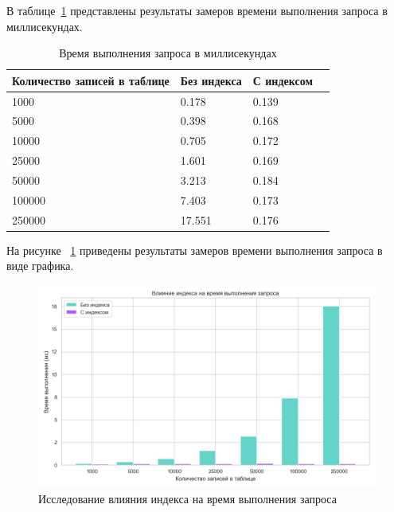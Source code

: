 В таблице~\ref{birthdate_table} представлены результаты замеров времени выполнения запроса в миллисекундах.


\newpage
\begin{table}[ht]
	\begin{center}
		\begin{threeparttable}
			\caption{\label{birthdate_table} Время выполнения запроса в миллисекундах}
			\begin{tabular}{|p{7cm}|p{4cm}|p{4cm}|c|}
				\hline
				\textbf{Количество записей в таблице} & \textbf{Без индекса} & {\textbf{С индексом}} \\ \hline
				1000 & 0.178 & 0.139 \\ \hline
				5000 & 0.398 & 0.168 \\ \hline
				10000 & 0.705 & 0.172 \\ \hline
				25000 & 1.601 & 0.169 \\ \hline
				50000 & 3.213 & 0.184 \\ \hline
				100000 & 7.403 & 0.173 \\ \hline
				250000 & 17.551 & 0.176 \\ \hline
			\end{tabular}
		\end{threeparttable}
	\end{center}
\end{table}

На рисунке ~\ref{birth_graph} приведены результаты замеров времени выполнения запроса в виде графика.

\begin{figure}[H]
	\centering
	\includegraphics[width=1\linewidth]{img/graph_select_birthdate.png}
	\caption{Исследование влияния индекса на время выполнения запроса}
	\label{birth_graph}
\end{figure}


